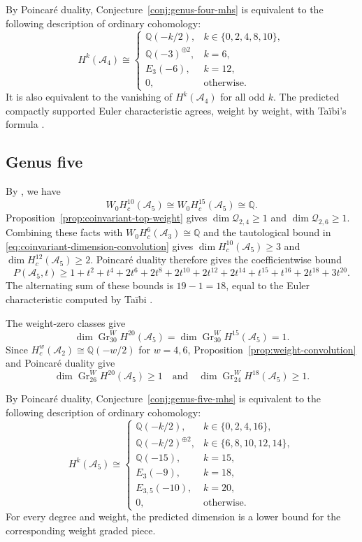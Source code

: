 \documentclass[12 pt]{amsart}
\newcommand{\QQ}{\mathbb{Q}}
\newcommand{\cA}{\mathcal{A}}
\newcommand{\cQ}{\mathcal{Q}}
\newcommand{\Gr}{\operatorname{Gr}}
\newcommand{\<}{\langle}
\renewcommand{\>}{\rangle}
\theoremstyle{definition}
\begin{document}
\noindent By Poincar\'e duality, Conjecture~\ref{conj:genus-four-mhs} is equivalent to the following description of ordinary cohomology:
\[
H^k(\cA_4) \cong
\begin{cases}
\QQ(-k/2), & k \in \{0, 2, 4, 8, 10\},\\
\QQ(-3)^{ \oplus 2}, & k = 6,\\
E_3(-6), & k = 12,\\
0, & \text{otherwise}.
\end{cases}
\]
It is also equivalent to the vanishing of $H^k(\cA_4)$ for all odd $k$. The predicted compactly supported Euler characteristic agrees, weight by weight, with Ta\"ibi's formula \cite[Theorem~1]{TaibiEuler}.

\subsection{Genus five}\label{sec:betti-genus-five}

By \cite[Table~1]{BCGP}, we have
\[
W_0 H_c^{10}(\cA_5) \cong W_0 H_c^{15}(\cA_5) \cong \QQ.
\]
Proposition~\ref{prop:coinvariant-top-weight} gives $\dim \cQ_{2, 4} \geq 1$ and $\dim \cQ_{2, 6} \geq 1$. Combining these facts with $W_0 H_c^6(\cA_3) \cong \QQ$ and the tautological bound in \eqref{eq:coinvariant-dimension-convolution} gives $\dim H_c^{10}(\cA_5) \geq 3$ and $\dim H_c^{12}(\cA_5) \geq 2$. Poincar\'e duality therefore gives the coefficientwise bound
\begin{equation}\label{eq:genus-five-betti-bound}
P(\cA_5, t) \geq 1 + t^2 + t^4 + 2t^6 + 2t^8 + 2t^{10} + 2t^{12} + 2t^{14} + t^{15} + t^{16} + 2t^{18} + 3t^{20}.
\end{equation}
The alternating sum of these bounds is $19 - 1 = 18$, equal to the Euler characteristic computed by Ta\"ibi \cite[\S7.1]{HulekTommasiTopology}.

The weight-zero classes give
\[
\dim \Gr_{30}^W H^{20}(\cA_5) = \dim \Gr_{30}^W H^{15}(\cA_5) = 1.
\]
Since $H_c^w(\cA_2) \cong \QQ(-w/2)$ for $w = 4, 6$, Proposition~\ref{prop:weight-convolution} and Poincar\'e duality give
\[
\dim \Gr_{26}^W H^{20}(\cA_5) \geq 1 \quad \text{and} \quad \dim \Gr_{24}^W H^{18}(\cA_5) \geq 1.
\]

By Poincar\'e duality, Conjecture~\ref{conj:genus-five-mhs} is equivalent to the following description of ordinary cohomology:
\[
H^k(\cA_5) \cong
\begin{cases}
\QQ(-k/2), & k \in \{0, 2, 4, 16\},\\
\QQ(-k/2)^{ \oplus 2}, & k \in \{6, 8, 10, 12, 14\},\\
\QQ(-15), & k = 15,\\
E_3(-9), & k = 18,\\
E_{3, 5}(-10), & k = 20,\\
0, & \text{otherwise}.
\end{cases}
\]
For every degree and weight, the predicted dimension is a lower bound for the corresponding weight graded piece.
\end{document}
